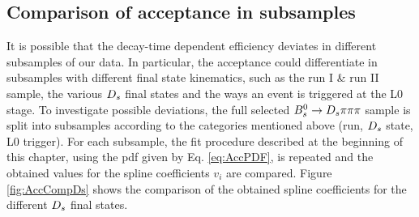 \newpage

\subsection{Comparison of acceptance in subsamples}
\label{subsec: AccComparison}

It is possible that the decay-time dependent efficiency deviates in different subsamples of our data. 
In particular, the acceptance could differentiate in subsamples with different final state kinematics, such as the run I \& run II sample, the various ${{D}_{s}}$ final states and the ways an event is triggered at the L0 stage.
To investigate possible deviations, the full selected ${{B}^0_{s}}\rightarrow{\ensuremath{{D}_{s}}}{\ensuremath{\pi}}{\ensuremath{\pi}}{\ensuremath{\pi}}$ sample is split into subsamples according to the categories mentioned above (run, ${{D}_{s}}$ state, L0 trigger). 
For each subsample, the fit procedure described at the beginning of this chapter, using the pdf given by Eq. \ref{eq:AccPDF}, is repeated and the obtained values for the spline coefficients  $v_{i}$ are compared.
Figure \ref{fig:AccCompDs} shows the comparison of the obtained spline coefficients for the different ${{D}_{s}}$ final states.

